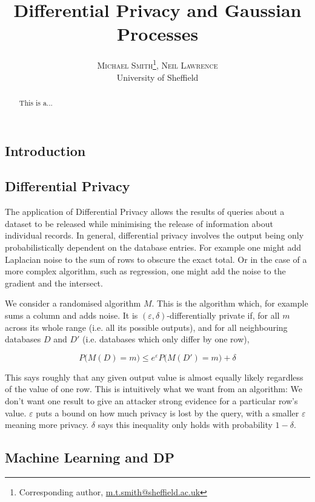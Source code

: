 \documentclass[a4paper]{article}
\title{\textbf{Differential Privacy and Gaussian Processes}} %
\author{
\large
\textsc{Michael Smith}\thanks{Corresponding author, \href{mailto:m.t.smith@sheffield.ac.uk}{m.t.smith@sheffield.ac.uk}}, \textsc{Neil Lawrence}\\[2mm]
\normalsize University of Sheffield\\ %
\vspace{-5mm}
}
\begin{document}
\maketitle 
\begin{abstract}
\noindent This is a...
\end{abstract}

\begin{multicols}{2}

\section{Introduction}

\subsection{Differential Privacy}

The application of Differential Privacy allows the results of queries about a dataset to be released while minimising the release of information about individual records. In general, differential privacy involves the output being only probabilistically dependent on the database entries. For example one might add Laplacian noise to the sum of rows to obscure the exact total. Or in the case of a more complex algorithm, such as regression, one might add the noise to the gradient and the intersect.

We consider a randomised algorithm $M$. This is the algorithm which, for example sums a column and adds noise. It is $(\varepsilon, \delta)$-differentially private if, for all $m$ across its whole range (i.e. all its possible outputs), and for all neighbouring databases $D$ and $D'$ (i.e. databases which only differ by one row),

$$P\Big( M(D) = m \Big) \leq e^{\varepsilon} P\Big( M(D') = m \Big) + \delta$$

This says roughly that any given output value is almost equally likely regardless of the value of one row. This is intuitively what we want from an algorithm: We don't want one result to give an attacker strong evidence for a particular row's value. $\varepsilon$ puts a bound on how much privacy is lost by the query, with a smaller $\varepsilon$ meaning more privacy. $\delta$ says this inequality only holds with probability $1-\delta$.

\subsection{Machine Learning and DP}


\end{multicols}
\end{document}
